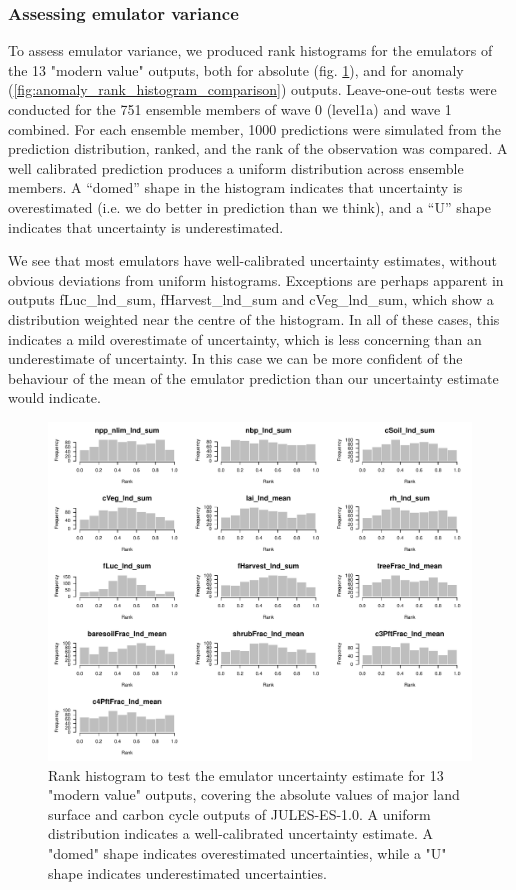 \documentclass[gmd, manuscript]{copernicus}
\begin{document}
\subsubsection{Assessing emulator variance}\label{app:emulator_variance} 

To assess emulator variance, we produced rank histograms \citep{hamill2001interpretation} for the emulators of the 13 "modern value" outputs, both for absolute (fig. \ref{fig:rank_histogram_comparison}), and for anomaly (\ref{fig:anomaly_rank_histogram_comparison}) outputs. Leave-one-out tests were conducted for the 751 ensemble members of wave 0 (level1a) and wave 1 combined. For each ensemble member, 1000 predictions were simulated from the prediction distribution, ranked, and the rank of the observation was compared. A well calibrated prediction produces a uniform distribution across ensemble members. A “domed” shape in the histogram indicates that uncertainty is overestimated (i.e. we do better in prediction than we think), and a “U” shape indicates that uncertainty is underestimated. 

We see that most emulators have well-calibrated uncertainty estimates, without obvious deviations from uniform histograms. Exceptions are perhaps apparent in outputs fLuc\_lnd\_sum, fHarvest\_lnd\_sum and cVeg\_lnd\_sum, which show a distribution weighted near the centre of the histogram. In all of these cases, this indicates a mild overestimate of uncertainty, which is less concerning than an underestimate of uncertainty. In this case we can be more confident of the behaviour of the mean of the emulator prediction than our uncertainty estimate would indicate.


\begin{figure}[ht]
\includegraphics[width=12cm]{./figs/figA04.pdf}
\caption{Rank histogram to test the emulator uncertainty estimate for 13 "modern value" outputs, covering the absolute values of major land surface and carbon cycle outputs of JULES-ES-1.0. A uniform distribution indicates a well-calibrated uncertainty estimate. A "domed" shape indicates overestimated uncertainties, while a "U" shape indicates underestimated uncertainties.}
\label{fig:rank_histogram_comparison}
\end{figure}
\end{document}
